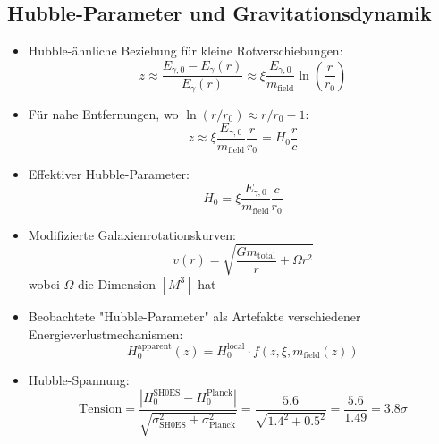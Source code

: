\documentclass[12pt,a4paper]{article}
\begin{document}
	\subsection{Hubble-Parameter und Gravitationsdynamik}
	\begin{itemize}
		\item Hubble-ähnliche Beziehung für kleine Rotverschiebungen:
		\begin{equation}
			z \approx \frac{E_{\gamma,0} - E_\gamma(r)}{E_\gamma(r)} \approx \xi \frac{E_{\gamma,0}}{m_{\text{field}}} \ln\left(\frac{r}{r_0}\right)
		\end{equation}
		
		\item Für nahe Entfernungen, wo $\ln(r/r_0) \approx r/r_0 - 1$:
		\begin{equation}
			z \approx \xi \frac{E_{\gamma,0}}{m_{\text{field}}} \frac{r}{r_0} = H_0 \frac{r}{c}
		\end{equation}
		
		\item Effektiver Hubble-Parameter:
		\begin{equation}
			H_0 = \xi \frac{E_{\gamma,0}}{m_{\text{field}}} \frac{c}{r_0}
		\end{equation}
		
		\item Modifizierte Galaxienrotationskurven:
		\begin{equation}
			v(r) = \sqrt{\frac{Gm_{\text{total}}}{r} + \Omega r^2}
		\end{equation}
		wobei $\Omega$ die Dimension $[M^3]$ hat
		
		\item Beobachtete "Hubble-Parameter" als Artefakte verschiedener Energieverlustmechanismen:
		\begin{equation}
			H_0^{\text{apparent}}(z) = H_0^{\text{local}} \cdot f(z, \xi, m_{\text{field}}(z))
		\end{equation}
		
		\item Hubble-Spannung:
		\begin{equation}
			\text{Tension} = \frac{|H_0^{\text{SH0ES}} - H_0^{\text{Planck}}|}{\sqrt{\sigma_{\text{SH0ES}}^2 + \sigma_{\text{Planck}}^2}} = \frac{5.6}{\sqrt{1.4^2 + 0.5^2}} = \frac{5.6}{1.49} = 3.8\sigma
		\end{equation}
	\end{itemize}
	
\end{document}
